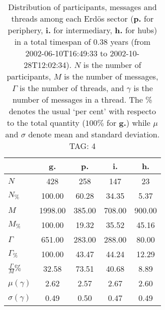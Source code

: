 \begin{table}[h!]
\begin{center}
\begin{tabular}{| l | c | c | c | c |}\hline
 & g. & p. & i. & h. \\\hline
$N$ & 428  & 258  & 147  & 23 \\\hline
$N_{\%}$ & 100.00  & 60.28  & 34.35  & 5.37 \\\hline
$M$ & 1998.00  & 385.00  & 708.00  & 900.00 \\\hline
$M_{\%}$ & 100.00  & 19.32  & 35.52  & 45.16 \\\hline
$\Gamma$ & 651.00  & 283.00  & 288.00  & 80.00 \\\hline
$\Gamma_{\%}$ & 100.00  & 43.47  & 44.24  & 12.29 \\\hline
$\frac{\Gamma}{M}\%$ & 32.58  & 73.51  & 40.68  & 8.89 \\\hline
$\mu(\gamma)$ & 2.62  & 2.57  & 2.67  & 2.60 \\\hline
$\sigma(\gamma)$ & 0.49  & 0.50  & 0.47  & 0.49 \\\hline
\end{tabular}
\caption{Distribution of participants, messages and threads among each Erd\"os sector ({\bf p.} for periphery, {\bf i.} for intermediary, 
    {\bf h.} for hubs) in a total timespan of 0.38 years (from 2002-06-10T16:49:33 to 2002-10-28T12:02:34). $N$ is the number of participants, $M$ is the number of messages, $\Gamma$ is the number of threads, and $\gamma$ is the number of messages in a thread.
    The \% denotes the usual `per cent' with respecto to the total quantity ($100\%$ for {\bf g.})
    while $\mu$ and $\sigma$ denote mean and standard deviation. TAG: 4}
\end{center}
\end{table}